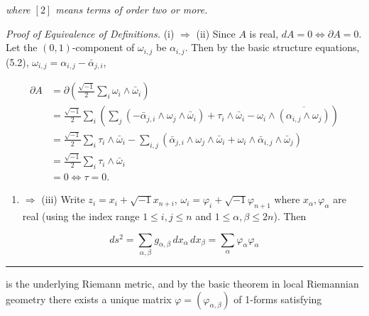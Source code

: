 \documentclass[
  english,
  a3paper,
  a3paper]{extarticle}
\providecommand{\tightlist}{%
  \setlength{\itemsep}{0pt}\setlength{\parskip}{0pt}}
\begin{document}
\emph{where \([2]\) means terms of order two or more.}

\emph{Proof of Equivalence of Definitions.} (i) \(\Rightarrow\) (ii)
Since \(A\) is real, \(dA=0\Longleftrightarrow\partial A=0\). Let the
\((0,1)\)-component of \(\omega_{i,j}\) be \(\alpha_{i,j}\). Then by the
basic structure equations, (5.2),
\(\omega_{i,j}=\alpha_{i,j}-\bar\alpha_{j,i}\),

\[\begin{aligned}\partial A&=\partial\left(\frac{\sqrt{-1}}2\sum_i\omega_i\wedge\bar\omega_i\right)\\&=\frac{\sqrt{-1}}2\sum_i\left(\sum_j(-\bar\alpha_{j,i}\wedge\omega_j\wedge\bar\omega_i)+\tau_i\wedge\bar\omega_i-\omega_i\wedge\overline{(\alpha_{i,j}\wedge\omega_j)}\right)\\&=\frac{\sqrt{-1}}2\sum_i\tau_i\wedge\bar\omega_i-\sum_{i,j}(\bar\alpha_{j,i}\wedge\omega_j\wedge\bar\omega_i+\omega_i\wedge\bar\alpha_{i,j}\wedge\bar\omega_j)\\&=\frac{\sqrt{-1}}2\sum_i\tau_i\wedge\bar\omega_i\\&=0\Longleftrightarrow\tau=0.\end{aligned}\]

\begin{enumerate}
\def\labelenumi{(\roman{enumi})}
\setcounter{enumi}{1}
\tightlist
\item
  \(\Rightarrow\) (iii) Write \(z_i=x_i+\sqrt{-1}x_{n+i}\),
  \(\omega_i=\varphi_i+\sqrt{-1}\varphi_{n+1}\) where
  \(x_\alpha,\varphi_\alpha\) are real (using the index range
  \(1\le i,j\le n\) and \(1\le\alpha,\beta\le2n\)). Then
\end{enumerate}

\[ds^2=\sum_{\alpha,\beta}g_{\alpha,\beta}\,dx_\alpha\,dx_\beta=\sum_\alpha\varphi_\alpha\varphi_\alpha\]

\clearpage



\par

\vspace{0.7mm}\hrule\vspace{1.6mm}

\fontsize{9}{11}\selectfont

is the underlying Riemann metric, and by the basic theorem in local
Riemannian geometry there exists a unique matrix
\(\varphi=(\varphi_{\alpha,\beta})\) of 1-forms satisfying
\end{document}
